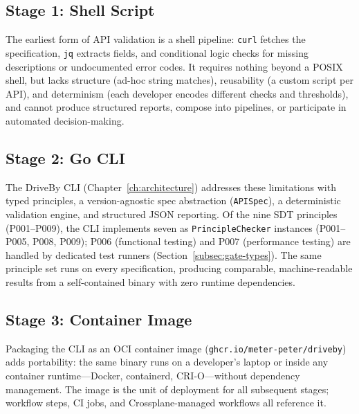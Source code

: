 \subsection{Stage 1: Shell Script}
\label{subsec:stage-shell}

The earliest form of API validation is a shell pipeline: \texttt{curl} fetches the specification, \texttt{jq} extracts fields, and conditional logic checks for missing descriptions or undocumented error codes. It requires nothing beyond a POSIX shell, but lacks structure (ad-hoc string matches), reusability (a custom script per API), and determinism (each developer encodes different checks and thresholds), and cannot produce structured reports, compose into pipelines, or participate in automated decision-making.

\subsection{Stage 2: Go CLI}
\label{subsec:stage-cli}

The DriveBy CLI (Chapter~\ref{ch:architecture}) addresses these limitations with typed principles, a version-agnostic spec abstraction (\texttt{APISpec}), a deterministic validation engine, and structured JSON reporting. Of the nine SDT principles (P001--P009), the CLI implements seven as \texttt{PrincipleChecker} instances (P001--P005, P008, P009); P006 (functional testing) and P007 (performance testing) are handled by dedicated test runners (Section~\ref{subsec:gate-types}). The same principle set runs on every specification, producing comparable, machine-readable results from a self-contained binary with zero runtime dependencies.

\subsection{Stage 3: Container Image}
\label{subsec:stage-container}

Packaging the CLI as an OCI container image (\texttt{ghcr.io/\allowbreak meter-peter/\allowbreak driveby}) adds portability: the same binary runs on a developer's laptop or inside any container runtime---Docker, containerd, CRI-O---without dependency management. The image is the unit of deployment for all subsequent stages; workflow steps, CI jobs, and Crossplane-managed workflows all reference it.

